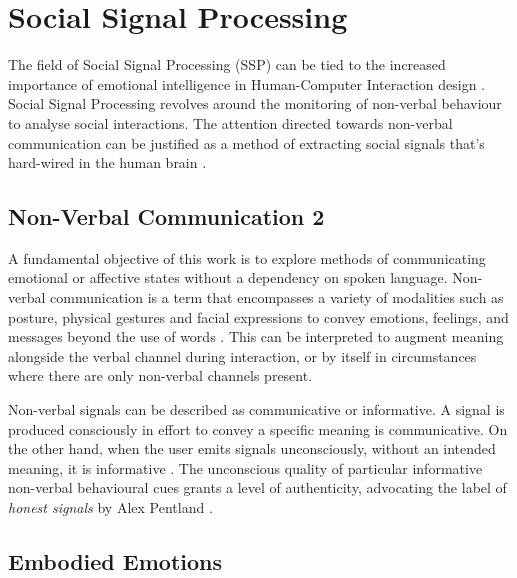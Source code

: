 \section{Social Signal Processing}

The field of Social Signal Processing (SSP) can be tied to the increased importance of emotional intelligence in Human-Computer Interaction design \cite{cristescu_emotions_2008}. Social Signal Processing revolves around the monitoring of non-verbal behaviour to analyse social interactions. The attention directed towards non-verbal communication can be justified as a method of extracting social signals that's hard-wired in the human brain \cite{vinciarelli_social_2009-1}.

\subsection{Non-Verbal Communication 2}

A fundamental objective of this work is to explore methods of communicating emotional or affective states without a dependency on spoken language. Non-verbal communication is a term that encompasses a variety of modalities such as posture, physical gestures and facial expressions to convey emotions, feelings, and messages beyond the use of words \cite{knapp_nonverbal_2009, richmond_nonverbal_2011}. This can be interpreted to augment meaning alongside the verbal channel during interaction, or by itself in circumstances where there are only non-verbal channels present.

Non-verbal signals can be described as communicative or informative. A signal is produced consciously in effort to convey a specific meaning is communicative. On the other hand, when the user emits signals unconsciously, without an intended meaning, it is informative \cite{vinciarelli_towards_2011}. The unconscious quality of particular informative non-verbal behavioural cues grants a level of authenticity, advocating the label of \textit{honest signals} by Alex Pentland \cite{pentland_honest_2010}.

\subsection{Embodied Emotions}

